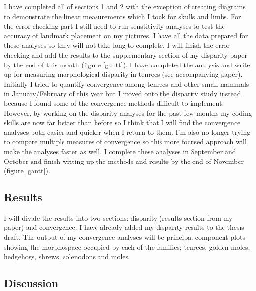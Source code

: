 \documentclass[12pt,a4paper]{article}
\begin{document}
	I have completed all of sections 1 and 2 with the exception of creating diagrams to demonstrate the linear measurements which I took for skulls and limbs. For the error checking part I still need to run senstitivity analyses to test the accuracy of landmark placement on my pictures. I have all the data prepared for these analyses so they will not take long to complete. I will finish the error checking and add the results to the supplementary section of my disparity paper by the end of this month (figure \ref{gantt}).
	I have completed the analysis and write up for measuring morphological disparity in tenrecs (see accompanying paper).	
	Initially I tried to quantify convergence among tenrecs and other small mammals in January/February of this year but I moved onto the disparity study instead because I found some of the convergence methods difficult to implement. However, by working on the disparity analyses for the past few months my coding skills are now far better than before so I think that I will find the convergence analyses both easier and quicker when I return to them. I'm also no longer trying to compare multiple measures of convergence so this more focused approach will make the analyses faster as well. I complete these analyses in September and October and finish writing up the methods and results by the end of November (figure \ref{gantt}).
	
 
\subsection{Results}
	I will divide the results into two sections: disparity (results section from my paper) and convergence. I have already added my disparity results to the thesis draft.
	The output of my convergence analyses will be principal component plots showing the morphospace occupied by each of the families; tenrecs, golden moles, hedgehogs, shrews, solenodons and moles.
	

\subsection{Discussion}
\end{document}
